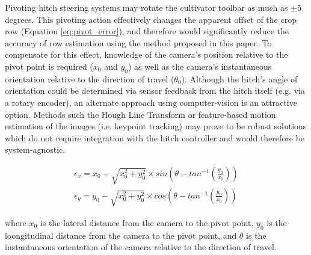 \documentclass[authoryear]{elsarticle}
\begin{document}
Pivoting hitch steering systems may rotate the cultivator toolbar as
much as $\pm5$ degrees. This pivoting action effectively changes the
apparent offset of the crop row (Equation \ref{eq:pivot_error}), and
therefore would significantly reduce the accuracy of row estimation
using the method proposed in this paper. To compensate for this
effect, knowledge of the camera's position relative to the pivot point
is required ($x_0$ and $y_0$) as well as the camera's instantaneous
orientation relative to the direction of travel ($\theta_0$). Although
the hitch's angle of orientation could be determined via sensor
feedback from the hitch itself (e.g. via a rotary encoder), an
alternate approach using computer-vision is an attractive
option. Methods such the Hough Line Transform or feature-based motion
estimation of the images (i.e. keypoint tracking) may prove to be
robust solutions which do not require integration with the hitch
controller and would therefore be system-agnostic.

\begin{equation}
  \begin{split}
  \epsilon_x = x_0 - \sqrt{x_0^2 + y_0^2} \times sin\left(\theta -
  tan^{-1}(\frac{y_0}{x_0})\right) \\
  \epsilon_y = y_0 - \sqrt{x_0^2 + y_0^2} \times cos\left(\theta -
  tan^{-1}(\frac{y_0}{x_0})\right)
  \end{split}
  \label{eq:pivot_error}
\end{equation}
\begin{flushleft}
where $x_0$ is the lateral distance from the camera to the pivot
point, $y_0$ is the loongitudinal distance from the camera to the pivot
point, and $\theta$ is the instantaneous orientation of the camera relative to the
direction of travel.
\end{flushleft}
\end{document}
